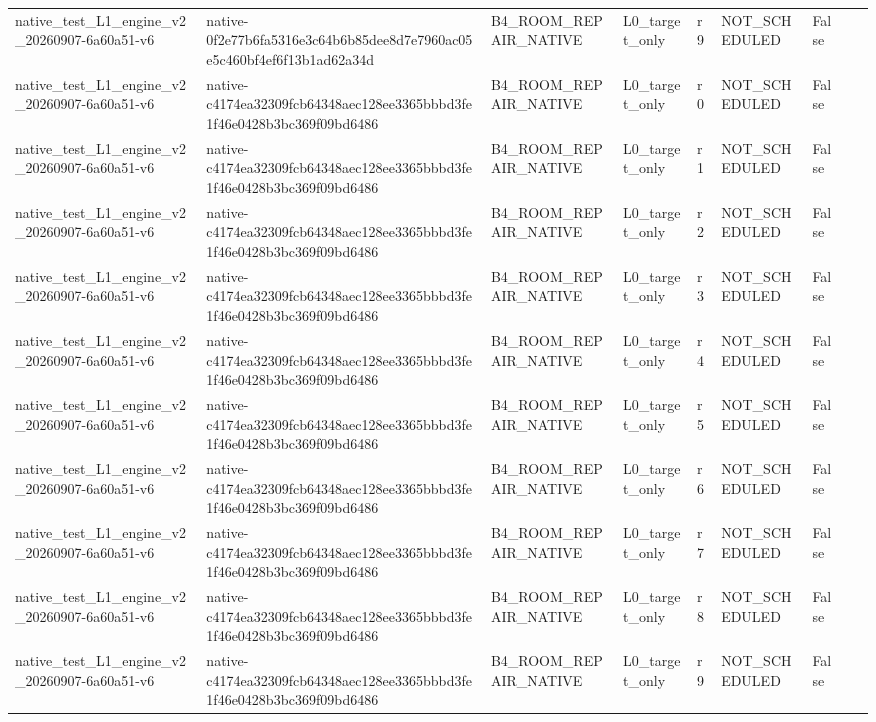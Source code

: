 \begin{tabular}{lllllllll}
native\_test\_L1\_engine\_v2\_20260907-6a60a51-v6 & native-0f2e77b6fa5316e3c64b6b85dee8d7e7960ac05e5c460bf4ef6f13b1ad62a34d & B4\_ROOM\_REPAIR\_NATIVE & L0\_target\_only & r9 & NOT\_SCHEDULED & False &  &  \\
native\_test\_L1\_engine\_v2\_20260907-6a60a51-v6 & native-c4174ea32309fcb64348aec128ee3365bbbd3fe1f46e0428b3bc369f09bd6486 & B4\_ROOM\_REPAIR\_NATIVE & L0\_target\_only & r0 & NOT\_SCHEDULED & False &  &  \\
native\_test\_L1\_engine\_v2\_20260907-6a60a51-v6 & native-c4174ea32309fcb64348aec128ee3365bbbd3fe1f46e0428b3bc369f09bd6486 & B4\_ROOM\_REPAIR\_NATIVE & L0\_target\_only & r1 & NOT\_SCHEDULED & False &  &  \\
native\_test\_L1\_engine\_v2\_20260907-6a60a51-v6 & native-c4174ea32309fcb64348aec128ee3365bbbd3fe1f46e0428b3bc369f09bd6486 & B4\_ROOM\_REPAIR\_NATIVE & L0\_target\_only & r2 & NOT\_SCHEDULED & False &  &  \\
native\_test\_L1\_engine\_v2\_20260907-6a60a51-v6 & native-c4174ea32309fcb64348aec128ee3365bbbd3fe1f46e0428b3bc369f09bd6486 & B4\_ROOM\_REPAIR\_NATIVE & L0\_target\_only & r3 & NOT\_SCHEDULED & False &  &  \\
native\_test\_L1\_engine\_v2\_20260907-6a60a51-v6 & native-c4174ea32309fcb64348aec128ee3365bbbd3fe1f46e0428b3bc369f09bd6486 & B4\_ROOM\_REPAIR\_NATIVE & L0\_target\_only & r4 & NOT\_SCHEDULED & False &  &  \\
native\_test\_L1\_engine\_v2\_20260907-6a60a51-v6 & native-c4174ea32309fcb64348aec128ee3365bbbd3fe1f46e0428b3bc369f09bd6486 & B4\_ROOM\_REPAIR\_NATIVE & L0\_target\_only & r5 & NOT\_SCHEDULED & False &  &  \\
native\_test\_L1\_engine\_v2\_20260907-6a60a51-v6 & native-c4174ea32309fcb64348aec128ee3365bbbd3fe1f46e0428b3bc369f09bd6486 & B4\_ROOM\_REPAIR\_NATIVE & L0\_target\_only & r6 & NOT\_SCHEDULED & False &  &  \\
native\_test\_L1\_engine\_v2\_20260907-6a60a51-v6 & native-c4174ea32309fcb64348aec128ee3365bbbd3fe1f46e0428b3bc369f09bd6486 & B4\_ROOM\_REPAIR\_NATIVE & L0\_target\_only & r7 & NOT\_SCHEDULED & False &  &  \\
native\_test\_L1\_engine\_v2\_20260907-6a60a51-v6 & native-c4174ea32309fcb64348aec128ee3365bbbd3fe1f46e0428b3bc369f09bd6486 & B4\_ROOM\_REPAIR\_NATIVE & L0\_target\_only & r8 & NOT\_SCHEDULED & False &  &  \\
native\_test\_L1\_engine\_v2\_20260907-6a60a51-v6 & native-c4174ea32309fcb64348aec128ee3365bbbd3fe1f46e0428b3bc369f09bd6486 & B4\_ROOM\_REPAIR\_NATIVE & L0\_target\_only & r9 & NOT\_SCHEDULED & False &  &  \\

\end{tabular}
